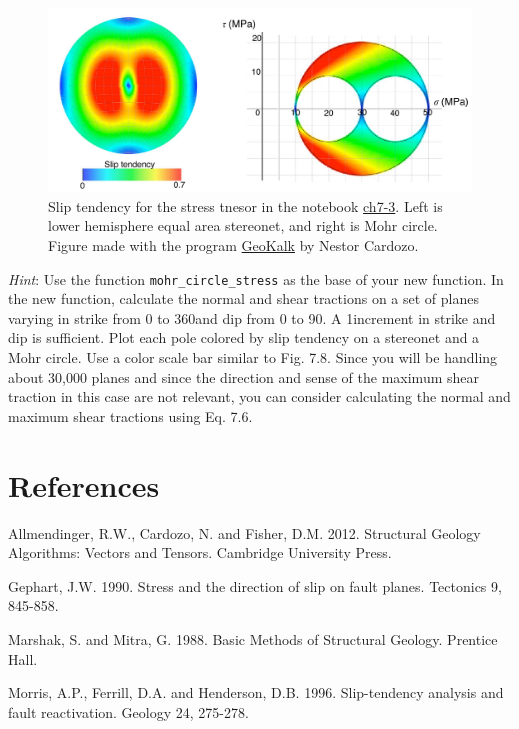 \documentclass[a4paper , 12pt]{book}
\newcommand{\code}[1]{\colorbox{light-gray}{\texttt{#1}}}
\begin{document}
\begin{enumerate}
    \begin{figure}[ht]
    \centering
    \includegraphics[width=13cm]{ch7f10.pdf}
    \caption{Slip tendency for the stress tnesor in the notebook \href{https://github.com/nfcd/compGeo/blob/master/source/notebooks/ch7-3.ipynb}{ch7-3}. Left is lower hemisphere equal area stereonet, and right is Mohr circle. Figure made with the program \href{https://www.ux.uis.no/~nestor/work/programs.html}{GeoKalk} by Nestor Cardozo.} 
    \end{figure}
    
    \textit{Hint}: Use the function {\code{mohr\_circle\_stress}} as the base of your new function. In the new function, calculate the normal and shear tractions on a set of planes varying in strike from 0 to 360\degree\space and dip from 0 to 90\degree. A 1\degree\space increment in strike and dip is sufficient. Plot each pole colored by slip tendency on a stereonet and a Mohr circle. Use a color scale bar similar to Fig. 7.8. Since you will be handling about 30,000 planes and since the direction and sense of the maximum shear traction in this case are not relevant, you can consider calculating the normal and maximum shear tractions using Eq. 7.6.
    
\end{enumerate}

\section*{References}

Allmendinger, R.W., Cardozo, N. and Fisher, D.M. 2012. Structural Geology Algorithms: Vectors and Tensors. Cambridge University Press.

Gephart, J.W. 1990. Stress and the direction of slip on fault planes. Tectonics 9, 845-858.

Marshak, S. and Mitra, G. 1988. Basic Methods of Structural Geology. Prentice Hall.

Morris, A.P., Ferrill, D.A. and Henderson, D.B. 1996. Slip-tendency analysis and fault reactivation. Geology 24, 275-278.
\end{document}
